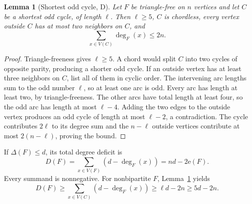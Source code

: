 \documentclass[11pt]{article}
\newtheorem{lemma}[theorem]{Lemma}
\theoremstyle{remark}
\newcommand{\e}{\mathrm{e}}
\begin{document}
\begin{lemma}[Shortest odd cycle, D]\label{lem:cycle}
Let $F$ be triangle-free on $n$ vertices and let $C$ be a shortest odd cycle, of length $\ell$. Then $\ell\ge5$, $C$ is chordless, every vertex outside $C$ has at most two neighbors on $C$, and
\begin{equation}
\sum_{x\in V(C)}\deg_F(x)\le2n.
\end{equation}
\end{lemma}
\begin{proof}
Triangle-freeness gives $\ell\ge5$. A chord would split $C$ into two cycles of opposite parity, producing a shorter odd cycle.
If an outside vertex has at least three neighbors on $C$, list all of them in cyclic order. The intervening arc lengths sum to the odd number $\ell$, so at least one arc is odd. Every arc has length at least two, by triangle-freeness. The other arcs have total length at least four, so the odd arc has length at most $\ell-4$. Adding the two edges to the outside vertex produces an odd cycle of length at most $\ell-2$, a contradiction.
The cycle contributes $2\ell$ to its degree sum and the $n-\ell$ outside vertices contribute at most $2(n-\ell)$, proving the bound.
\end{proof}

If $\Delta(F)\le d$, its total degree deficit is
\begin{equation}\label{eq:deficitdef}
D(F)=\sum_{x\in V(F)}(d-\deg_F(x))=nd-2\e(F).
\end{equation}
Every summand is nonnegative. For nonbipartite $F$, Lemma~\ref{lem:cycle} yields
\begin{equation}\label{eq:deficit}
D(F)\ge\sum_{x\in V(C)}(d-\deg_F(x))
\ge\ell d-2n\ge5d-2n.
\end{equation}
\end{document}

